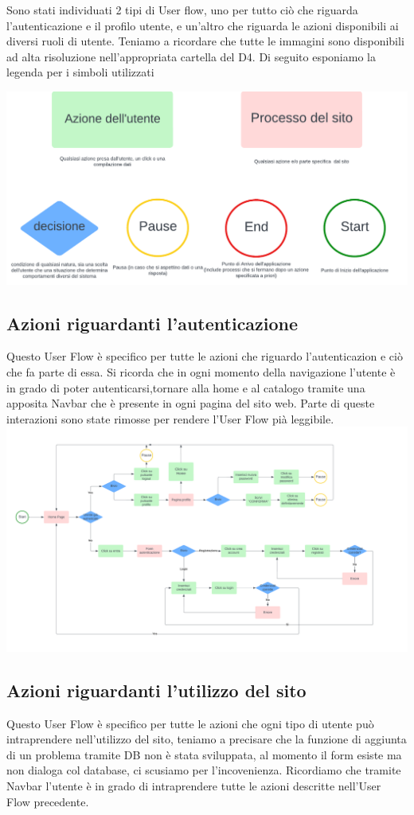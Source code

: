 \documentclass[11pt, a4paper]{article}
\theoremstyle{definition}
\begin{document}
Sono stati individuati 2 tipi di User flow, uno per 
tutto ciò che riguarda l'autenticazione e il profilo utente, e un'altro che riguarda le azioni disponibili ai diversi ruoli di utente.
Teniamo a ricordare che tutte le immagini sono disponibili ad alta risoluzione nell'appropriata cartella del D4.
Di seguito esponiamo la legenda per i simboli utilizzati

\begin{center}
  \includegraphics{materiale/UserFlow Symbols.png}
\end{center}
\newpage
\subsection{Azioni riguardanti l'autenticazione}
Questo User Flow è specifico per tutte le azioni che riguardo l'autenticazion e ciò che fa parte di essa. Si ricorda che in ogni momento della navigazione
l'utente è in grado di poter autenticarsi,tornare alla home e al catalogo tramite una apposita Navbar che è presente in ogni pagina del sito web. Parte di queste interazioni sono state rimosse per
rendere l'User Flow pià leggibile.
  \includegraphics[width=\textwidth]{materiale/UserFlow Autenticazione.png}
\newpage
\subsection{Azioni riguardanti l'utilizzo del sito}
Questo User Flow è specifico per tutte le azioni che ogni tipo di utente può intraprendere nell'utilizzo del sito, teniamo a precisare che la funzione di aggiunta di un problema tramite DB non è stata sviluppata, al momento il form esiste
ma non dialoga col database, ci scusiamo per l'incovenienza. Ricordiamo che tramite Navbar l'utente è in grado di intraprendere tutte le azioni descritte nell'User Flow precedente.
\end{document}
